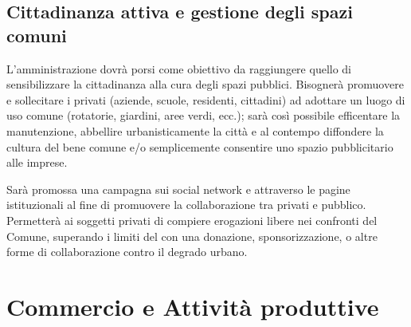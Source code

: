 \documentclass[a4paper,14pt,italian]{sphinxmanual}
\begin{document}



\section{Cittadinanza attiva e gestione degli spazi comuni}
\label{\detokenize{urbanistica:cittadinanza-attiva-e-gestione-degli-spazi-comuni}}
L’amministrazione dovrà porsi come obiettivo da raggiungere quello di sensibilizzare la cittadinanza alla cura degli spazi pubblici.
Bisognerà promuovere e sollecitare i privati (aziende, scuole, residenti, cittadini) ad adottare un luogo di uso comune (rotatorie, giardini, aree verdi, ecc.); sarà così possibile efficentare la manutenzione, abbellire urbanisticamente la città e al contempo diffondere la cultura del bene comune e/o semplicemente consentire uno spazio pubblicitario alle imprese.

Sarà promossa una campagna sui social network e attraverso le pagine istituzionali al fine di promuovere la collaborazione tra privati e pubblico.
Permetterà ai soggetti privati di compiere erogazioni libere nei confronti del Comune, superando i limiti del  con una donazione, sponsorizzazione, o altre forme di collaborazione contro il degrado urbano.


\chapter{Commercio e Attività produttive}
\label{\detokenize{commercio:commercio-e-attivita-produttive}}\label{\detokenize{commercio::doc}}

\end{document}
